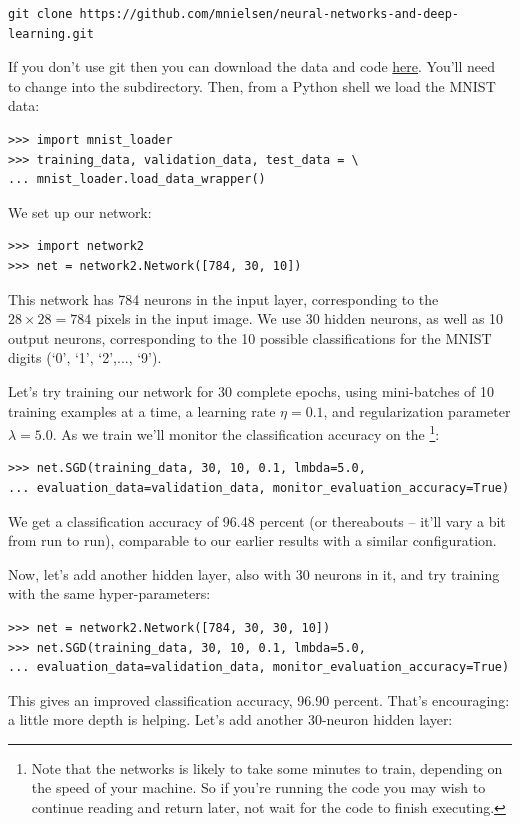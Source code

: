 \documentclass[a4paper,twoside,10pt]{book}
\begin{document}
\begin{lstlisting}
git clone https://github.com/mnielsen/neural-networks-and-deep-learning.git
\end{lstlisting}
If you don't use git then you can download the data and code \href{https://github.com/mnielsen/neural-networks-and-deep-learning/archive/master.zip}{here}. You'll need to change into the  subdirectory.
Then, from a Python shell we load the MNIST data:

\begin{lstlisting}
>>> import mnist_loader
>>> training_data, validation_data, test_data = \
... mnist_loader.load_data_wrapper()
\end{lstlisting}
We set up our network:

\begin{lstlisting}
>>> import network2
>>> net = network2.Network([784, 30, 10])
\end{lstlisting}
This network has 784 neurons in the input layer, corresponding to the $28\times28=784$ pixels in the input image. We use 30 hidden neurons, as well as 10 output neurons, corresponding to the 10 possible classifications for the MNIST digits (`0', `1', `2',..., `9').

Let's try training our network for 30 complete epochs, using mini-batches of 10 training examples at a time, a learning rate $\eta=0.1$, and regularization parameter $\lambda=5.0$. As we train we'll monitor the classification accuracy on the \footnote{Note that the networks is likely to take some minutes to train, depending on the speed of your machine. So if you're running the code you may wish to continue reading and return later, not wait for the code to finish executing.}:
\begin{lstlisting}
>>> net.SGD(training_data, 30, 10, 0.1, lmbda=5.0, 
... evaluation_data=validation_data, monitor_evaluation_accuracy=True)
\end{lstlisting}
We get a classification accuracy of 96.48 percent (or thereabouts -- it'll vary a bit from run to run), comparable to our earlier results with a similar configuration.

Now, let's add another hidden layer, also with 30 neurons in it, and try training with the same hyper-parameters:

\begin{lstlisting}
>>> net = network2.Network([784, 30, 30, 10])
>>> net.SGD(training_data, 30, 10, 0.1, lmbda=5.0, 
... evaluation_data=validation_data, monitor_evaluation_accuracy=True)
\end{lstlisting}
This gives an improved classification accuracy, 96.90 percent. That's encouraging: a little more depth is helping. Let's add another 30-neuron hidden layer:
\end{document}
